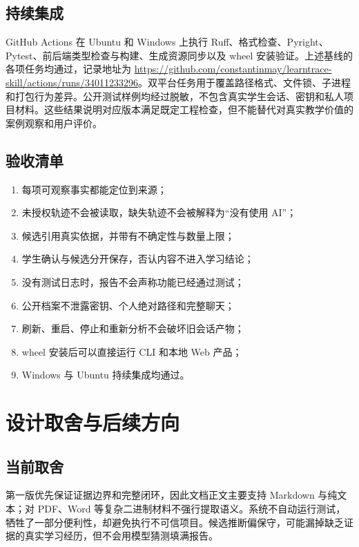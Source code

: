\documentclass[UTF8,a4paper,12pt]{ctexart}
\begin{document}
\subsection{持续集成}

GitHub Actions 在 Ubuntu 和 Windows 上执行 Ruff、格式检查、Pyright、Pytest、前后端类型检查与构建、生成资源同步以及 wheel 安装验证。上述基线的各项任务均通过，记录地址为 \url{https://github.com/constantinmay/learntrace-skill/actions/runs/34011233296}。双平台任务用于覆盖路径格式、文件锁、子进程和打包行为差异。公开测试样例均经过脱敏，不包含真实学生会话、密钥和私人项目材料。这些结果说明对应版本满足既定工程检查，但不能替代对真实教学价值的案例观察和用户评价。

\subsection{验收清单}

\begin{enumerate}
  \item 每项可观察事实都能定位到来源；
  \item 未授权轨迹不会被读取，缺失轨迹不会被解释为“没有使用 AI”；
  \item 候选引用真实依据，并带有不确定性与数量上限；
  \item 学生确认与候选分开保存，否认内容不进入学习结论；
  \item 没有测试日志时，报告不会声称功能已经通过测试；
  \item 公开档案不泄露密钥、个人绝对路径和完整聊天；
  \item 刷新、重启、停止和重新分析不会破坏旧会话产物；
  \item wheel 安装后可以直接运行 CLI 和本地 Web 产品；
  \item Windows 与 Ubuntu 持续集成均通过。
\end{enumerate}

\section{设计取舍与后续方向}

\subsection{当前取舍}

第一版优先保证证据边界和完整闭环，因此文档正文主要支持 Markdown 与纯文本；对 PDF、Word 等复杂二进制材料不强行提取语义。系统不自动运行测试，牺牲了一部分便利性，却避免执行不可信项目。候选推断偏保守，可能漏掉缺乏证据的真实学习经历，但不会用模型猜测填满报告。
\end{document}
